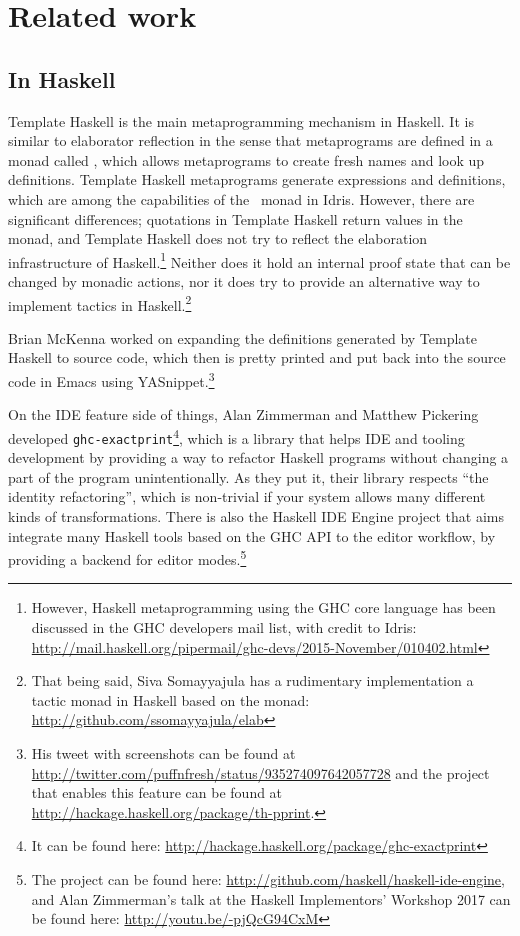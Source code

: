 \chapter{Related work} \label{chap:relatedwork}

\section{In Haskell}

Template Haskell \cite{th} is the main metaprogramming mechanism in Haskell.
It is similar to elaborator reflection in the sense that metaprograms are
defined in a monad called , which allows metaprograms to create fresh
names and look up definitions.
Template Haskell metaprograms generate expressions and definitions, which are
among the capabilities of the \Elab\ monad in Idris.
However, there are significant differences;
quotations in Template Haskell return values in the  monad, and Template
Haskell does not try to reflect the elaboration infrastructure of
Haskell.\footnote{However, Haskell metaprogramming using the GHC core language
has been discussed in the GHC developers mail list, with credit to Idris:
\url{http://mail.haskell.org/pipermail/ghc-devs/2015-November/010402.html}}
Neither does it hold an internal proof state that can be changed by monadic
actions, nor it does try to provide an alternative way to implement tactics in
Haskell.\footnote{That being said, Siva Somayyajula has a rudimentary
implementation a tactic monad in Haskell based on the  monad:
\url{http://github.com/ssomayyajula/elab}}

Brian McKenna worked on expanding the definitions generated by Template Haskell
to source code, which then is pretty printed and put back into the source code
in Emacs using YASnippet.\footnote{His tweet with screenshots can be found at
\url{http://twitter.com/puffnfresh/status/935274097642057728} and the project
that enables this feature can be found at
\url{http://hackage.haskell.org/package/th-pprint}.}

On the IDE feature side of things, Alan Zimmerman and Matthew Pickering
developed \texttt{ghc-exactprint}\footnote{It can be found here:
\url{http://hackage.haskell.org/package/ghc-exactprint}}, which is a library
that helps IDE and tooling development by providing a way to refactor Haskell
programs without changing a part of the program unintentionally. As they put
it, their library respects ``the identity refactoring'', which is non-trivial
if your system allows many different kinds of
transformations.\cite{ghc-exactprint-blog}
There is also the Haskell IDE Engine project that aims integrate many Haskell
tools based on the GHC API to the editor workflow, by providing a backend for
editor modes.\footnote{The project can be found here:
\url{http://github.com/haskell/haskell-ide-engine}, and Alan Zimmerman's talk
at the Haskell Implementors' Workshop 2017 can be found here:
\url{http://youtu.be/-pjQcG94CxM}}

